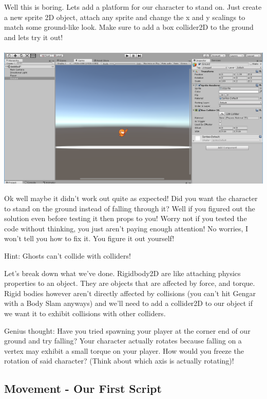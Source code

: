 \documentclass[12pt]{article}
\begin{document}
Well this is boring. Lets add a platform for our character to stand on. Just create a new sprite 2D object, attach any sprite and change the x and y scalings to match some ground-like look. Make sure to add a box collider2D to the ground and lets try it out!
\\\\
\includegraphics[scale=0.5]{Figure0311}

Ok well maybe it didn't work out quite as expected! Did you want the character to stand on the ground instead of falling through it? Well if you figured out the solution even before testing it then props to you! Worry not if you tested the code without thinking, you just aren't paying enough attention! No worries, I won't tell you how to fix it. You figure it out yourself!

Hint: Ghosts can't collide with colliders!

Let's break down what we've done. Rigidbody2D are like attaching physics properties to an object. They are objects that are affected by force, and torque. Rigid bodies however aren't directly affected by collisions (you can't hit Gengar with a Body Slam anyways) and we'll need to add a collider2D to our object if we want it to exhibit collisions with other colliders. 

Genius thought: Have you tried spawning your player at the corner end of our ground and try falling? Your character actually rotates because falling on a vertex may exhibit a small torque on your player. How would you freeze the rotation of said character? (Think about which axis is actually rotating)!

\newpage

\subsection{Movement - Our First Script}
\end{document}
